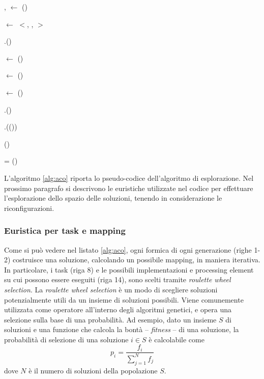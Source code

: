 \begin{algorithm}[!htbp]
{{{{				\ForAll{\Pi $\in$ \pSet}{
					\pIiPi $\leftarrow$ \mappingHeuristic(\Ii, \Pi)
				}
			}
			\chosenI, \chosenP $\leftarrow$ \rouletteSelection(\pIP)
			
			\chosenTrace $\leftarrow$ $<$\chosenT, \chosenI, \chosenP$>$
			
			\mappingTrace.\add(\chosenTrace)
			
			\readySet $\leftarrow$ \resolveDependencies()
		}

		\antMetrics $\leftarrow$ \computeMetrics(\antA)
		
		\antObjective $\leftarrow$ \computeObjective(\antMetrics)
		
		\thisGenerationSolutions.\add(\ant)
	}
	\bestAnts.\add(\selectBest(\thisGenerationSolutions))
	
	\updateGlobalPheromones(\bestAnts)
}

\bestAnt = \selectBestAnt(\bestAnts)
		
\Return \bestAntTrace

\caption{Pseudo-codice dell'algoritmo di esplorazione.}
\label{alg:aco}
\end{algorithm}

L'algoritmo \ref{alg:aco} riporta lo pseudo-codice dell'algoritmo di esplorazione.
Nel prossimo paragrafo si descrivono le euristiche utilizzate nel codice per effettuare
l'esplorazione dello spazio delle soluzioni, tenendo in considerazione le riconfigurazioni.


\subsubsection{Euristica per task e mapping}
Come si pu\`o vedere nel listato \ref{alg:aco}, ogni formica di ogni generazione (righe 1-2)
costruisce una soluzione, calcolando un possibile mapping, in maniera iterativa. In particolare,
i task (riga 8)  e le possibili implementazioni e processing element su cui possono essere eseguiti
(riga 14), sono scelti tramite \emph{roulette wheel selection}. La \emph{roulette wheel
selection} \`e un modo di scegliere soluzioni potenzialmente utili da un insieme di soluzioni possibili.
Viene comunemente utilizzata come operatore all'interno degli algoritmi genetici, e opera una selezione
sulla base di una probabilit\`a. Ad esempio, dato un insieme $S$ di soluzioni e una funzione che calcola
la bont\`a -- \emph{fitness} -- di una soluzione, la probabilit\`a di selezione di una soluzione
$i \in S$ \`e calcolabile come
\begin{displaymath}
  p_i = \frac{f_i}{\sum_{j=1}^{N}f_j}
\end{displaymath}
dove $N$ \`e il numero di soluzioni della popolazione $S$.

